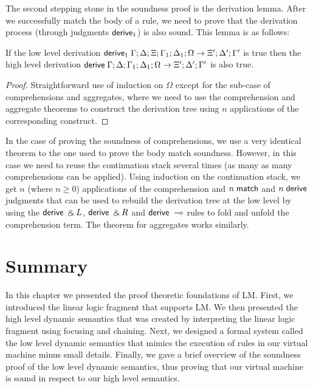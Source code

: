 The second stepping stone in the soundness proof is the derivation lemma. After we successfully match the
body of a rule, we need to prove that the derivation process (through judgments $\mathsf{derive}_1$) is also
sound. This lemma is as follows:

\begin{lemma}[Derivation]
   If the low level derivation $\mathsf{derive}_1 \; \Gamma; \Delta; \Xi; \Gamma_1; \Delta_1; \Omega \rightarrow \Xi'; \Delta'; \Gamma'$ is true then the high level derivation $\mathsf{derive} \; \Gamma; \Delta; \Gamma_1; \Delta_1; \Omega \rightarrow \Xi'; \Delta'; \Gamma'$ is also true.
\end{lemma}
\begin{proof}
   Straightforward use of induction on $\Omega$ except for the sub-case of comprehensions and aggregates, where we need to use the comprehension and aggregate theorems to construct the derivation tree using $n$ applications of the corresponding construct.
\end{proof}

In the case of proving the soundness of comprehensions, we use a very identical theorem to the one used
to prove the body match soundness. However, in this case we need to reuse the continuation stack several
times (as many as many comprehensions can be applied). Using induction on the continuation stack, we get
$n$ (where $n \ge 0$) applications of the comprehension and $n \; \mathsf{match}$ and $n \; \mathsf{derive}$ judgments
that can be used to rebuild the derivation tree at the low level by using the $\mathsf{derive} \; \mathbin{\binampersand} L$, $\mathsf{derive} \; \mathbin{\binampersand} R$
and $\mathsf{derive} \; \multimap$ rules to fold and unfold the comprehension term. The theorem for aggregates works similarly.

\section{Summary}

In this chapter we presented the proof theoretic foundations of LM.
First, we introduced the linear logic fragment that supports LM. We then presented the
high level dynamic semantics that was created by interpreting the linear logic fragment using
focusing and chaining. Next, we designed
a formal system called the low level dynamic semantics that mimics the execution of rules in
our virtual machine minus small details.
Finally, we gave a brief overview of the soundness proof of the low level dynamic semantics,
thus proving that our virtual machine is sound in respect to our high level semantics.


